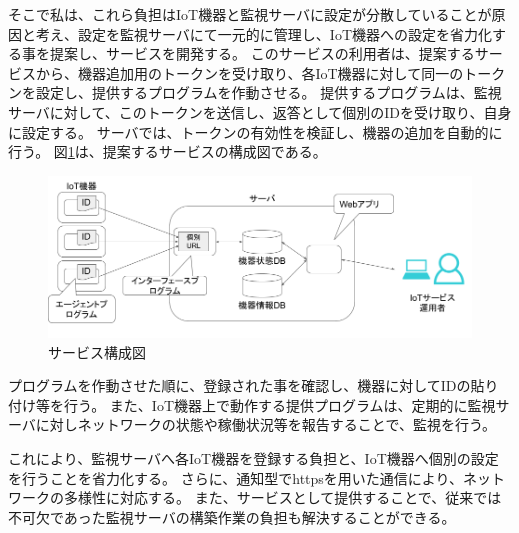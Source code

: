 そこで私は、これら負担はIoT機器と監視サーバに設定が分散していることが原因と考え、設定を監視サーバにて一元的に管理し、IoT機器への設定を省力化する事を提案し、サービスを開発する。
このサービスの利用者は、提案するサービスから、機器追加用のトークンを受け取り、各IoT機器に対して同一のトークンを設定し、提供するプログラムを作動させる。
提供するプログラムは、監視サーバに対して、このトークンを送信し、返答として個別のIDを受け取り、自身に設定する。
サーバでは、トークンの有効性を検証し、機器の追加を自動的に行う。
図\ref{fig:prop_diag}は、提案するサービスの構成図である。
\begin{figure}[htbp]
\includegraphics[width=16cm]{images/prop_diag.png}
\caption{サービス構成図}
\label{fig:prop_diag}
\end{figure}

プログラムを作動させた順に、登録された事を確認し、機器に対してIDの貼り付け等を行う。
また、IoT機器上で動作する提供プログラムは、定期的に監視サーバに対しネットワークの状態や稼働状況等を報告することで、監視を行う。

これにより、監視サーバへ各IoT機器を登録する負担と、IoT機器へ個別の設定を行うことを省力化する。
さらに、通知型でhttpsを用いた通信により、ネットワークの多様性に対応する。
また、サービスとして提供することで、従来では不可欠であった監視サーバの構築作業の負担も解決することができる。

